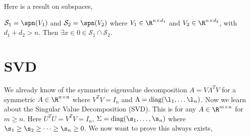
\noindent
Here is a result on subspaces,
\begin{nlemma}
  $\mathcal{S}_1 = \spn (V_1)$ and $\mathcal{S}_2 = \spn (V_2)$ where $V_1 \in \R^{n \times d_1}$ and $V_2 \in \R^{n \times d_2}$, with $d_1 + d_2 > n$. Then $\exists x \in 0 \in \mathcal{S}_1 \cap \mathcal{S}_2$.
\end{nlemma}

\section{SVD}
We already know of the symmetric eigenvalue decomposition $A = V \Lambda ^T V$ for a symmetric $A \in \R^{n \times n}$ where $V^T V = I_n$ and $\Lambda = \mathrm{diag}(\l_1, \dots \l_n)$. Now we learn about the Singular Value Decomposition (SVD). This is for any $A \in \R^{m \times n}$ for $m \ge n$. Here $U^T U = V^T V = I_n$, $\Sigma = \mathrm{diag}(\s_1, \dots, \s_n)$ where $\s_1 \ge \s_2 \ge \dots \ge \s_n \ge 0$. We now want to prove this always exists,
